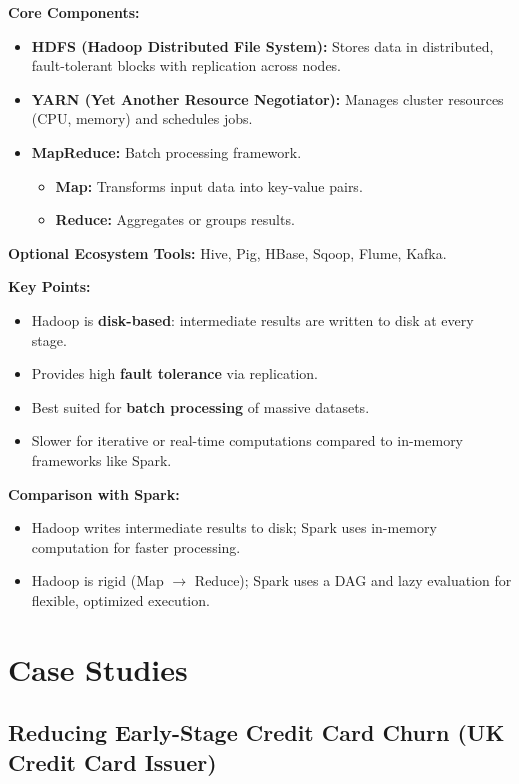 \documentclass[10pt,a4paper]{article}
\begin{document}
	\textbf{Core Components:}
	\begin{itemize}
	    \item \textbf{HDFS (Hadoop Distributed File System):} Stores data in distributed, fault-tolerant blocks with replication across nodes.
	    \item \textbf{YARN (Yet Another Resource Negotiator):} Manages cluster resources (CPU, memory) and schedules jobs.
	    \item \textbf{MapReduce:} Batch processing framework.
	    \begin{itemize}
	        \item \textbf{Map:} Transforms input data into key-value pairs.
	        \item \textbf{Reduce:} Aggregates or groups results.
	    \end{itemize}
	\end{itemize}
	
	\textbf{Optional Ecosystem Tools:} Hive, Pig, HBase, Sqoop, Flume, Kafka.
	
	\textbf{Key Points:}
	\begin{itemize}
	    \item Hadoop is \textbf{disk-based}: intermediate results are written to disk at every stage.
	    \item Provides high \textbf{fault tolerance} via replication.
	    \item Best suited for \textbf{batch processing} of massive datasets.
	    \item Slower for iterative or real-time computations compared to in-memory frameworks like Spark.
	\end{itemize}
	
	\textbf{Comparison with Spark:} 
	\begin{itemize}
	    \item Hadoop writes intermediate results to disk; Spark uses in-memory computation for faster processing.
	    \item Hadoop is rigid (Map $\rightarrow$ Reduce); Spark uses a DAG and lazy evaluation for flexible, optimized execution.
	\end{itemize}
	
	\newpage 
	\section{Case Studies}
	
	\subsection{Reducing Early-Stage Credit Card Churn (UK Credit Card Issuer)}
	
\end{document}

